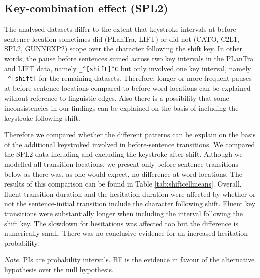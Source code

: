 \clearpage
\makeatletter
\efloat@restorefloats
\makeatother


\begin{appendix}
\section{}
\hypertarget{key-combination-effect-spl2}{%
\subsection{Key-combination effect
(SPL2)}\label{key-combination-effect-spl2}}

The analysed datasets differ to the extent that keystroke intervals at
before sentence location sometimes did (PLanTra, LIFT) or did not (CATO,
C2L1, SPL2, GUNNEXP2) scope over the character following the shift key.
In other words, the pause before sentences sumed across two key
intervals in the PLanTra and LIFT data, namely
\texttt{\_\^{}{[}shift{]}\^{}C} but only involved one key interval,
namely \texttt{\_\^{}{[}shift{]}} for the remaining datasets. Therefore,
longer or more frequent pauses at before-sentence locations compared to
before-word locations can be explained without reference to linguistic
edges. Also there is a possibility that some inconsistencies in our
findings can be explained on the basis of including the keystroke
following shift.

Therefore we compared whether the different patterns can be explain on
the basis of the additional keystroked involved in before-sentence
transitions. We compared the SPL2 data including and excluding the
keystroke after shift. Although we modelled all transition locations, we
present only before-sentence transitions below as there was, as one
would expect, no difference at word locations. The results of this
comparison can be found in Table \ref{tab:shiftcellmeans}. Overall,
fluent transition duration and the hesitation duration were affected by
whether or not the sentence-initial transition include the character
following shift. Fluent key transitions were substantially longer when
including the interval following the shift key. The slowdown for
hesitations was affected too but the difference is numerically small.
There was no conclusive evidence for an increased hesitation
probability.

\begin{center}
\begin{ThreePartTable}

\begin{TableNotes}[para]
\normalsize{\textit{Note.} PIs are probability intervals. BF is the evidence in favour of the alternative hypothesis over the null hypothesis.}
\end{TableNotes}


\end{ThreePartTable}
\end{center}
\end{appendix}
